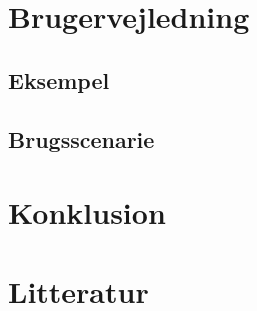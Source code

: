 \documentclass[final]{rapport1}
\begin{document}
\chapter{Brugervejledning}
\section{Eksempel}

\section{Brugsscenarie}

\chapter{Konklusion}

\chapter{Litteratur}
\end{document}
